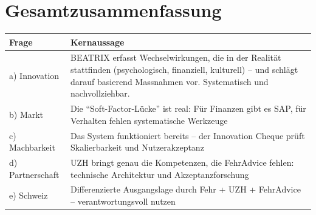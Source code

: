 \documentclass[11pt,a4paper]{article}
\begin{document}
\vspace{1cm}

\newpage


\section*{Gesamtzusammenfassung}

\begin{table}[h]
\centering
\begin{tabular}{@{}L{3cm}L{10cm}@{}}
\toprule
\textbf{Frage} & \textbf{Kernaussage} \\
\midrule
a) Innovation & BEATRIX erfasst Wechselwirkungen, die in der Realität stattfinden (psychologisch, finanziell, kulturell) -- und schlägt darauf basierend Massnahmen vor. Systematisch und nachvollziehbar. \\
b) Markt & Die ``Soft-Factor-Lücke'' ist real: Für Finanzen gibt es SAP, für Verhalten fehlen systematische Werkzeuge \\
c) Machbarkeit & Das System funktioniert bereits -- der Innovation Cheque prüft Skalierbarkeit und Nutzerakzeptanz \\
d) Partnerschaft & UZH bringt genau die Kompetenzen, die FehrAdvice fehlen: technische Architektur und Akzeptanzforschung \\
e) Schweiz & Differenzierte Ausgangslage durch Fehr + UZH + FehrAdvice -- verantwortungsvoll nutzen \\
\bottomrule
\end{tabular}
\end{table}
\end{document}
